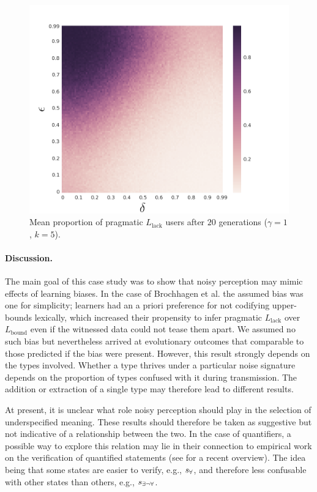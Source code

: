 \documentclass[10pt,a4paper]{article}
\newcommand{\state}{\ensuremath{s}\xspace}		%
\newcommand{\mystate}[1]{\ensuremath{\state_{\text{#1}}}\xspace} %
\newcommand{\ssome}{\mystate{\ensuremath{\exists\neg\forall}}}
\newcommand{\sall}{\mystate{\ensuremath{\forall}}}
\newcommand{\postparameter}{\ensuremath{\gamma}}
\begin{document}
\begin{figure}[ht]
\centering
    \includegraphics[scale=0.33]{../code/plots/quantifiers-posterior-sampling-k5.png}
  \caption{Mean proportion of pragmatic $L_{\text{lack}}$ users after $20$ generations ($\postparameter = 1$, $k = 5$).}
  \label{fig:quant}
\end{figure}


\paragraph{Discussion.} The main goal of this case study was to show that noisy perception may
mimic effects of learning biases. In the case of Brochhagen et al. the assumed bias was one
for simplicity; learners had an a priori preference for not codifying 
upper-bounds lexically, which increased their propensity to infer pragmatic
$L_{\text{lack}}$ over $L_{\text{bound}}$ even if the witnessed data could not tease them
apart. We assumed no such bias but nevertheless arrived at evolutionary outcomes that
comparable to those predicted if the bias were present. However, this result
strongly depends on the types involved. Whether a type thrives under a particular noise
signature depends on the proportion of types confused with it during transmission. The addition
or extraction of a single type may therefore lead to different results.

At present, it is unclear what role noisy perception should play in the selection of underspecified meaning. These results should therefore be taken as suggestive but not indicative of a relationship between the two. In the case of quantifiers, a possible way to explore this relation may lie in their connection to empirical work on the verification of quantified statements (see \citealt{szymanik:2016} for a recent overview). The idea being that some states are easier to verify, e.g., $\sall$, and therefore less confusable with other states than others, e.g., $\ssome$. 
\end{document}
